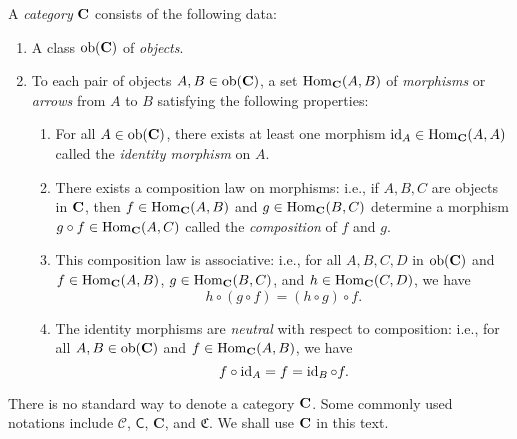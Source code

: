
\begin{definition}[Category]
    A \emph{category} \(\mathbf{C}\) consists of the following data:
    \begin{enumerate}[label=(\alph*), itemsep=0pt]
        \item A class \(\operatorname{ob}(\mathbf{\mathbf{C}})\) of \emph{objects}.
        \item To each pair of objects \(A, B \in \operatorname{ob}(\mathbf{\mathbf{C}})\), a set
        \(\operatorname{Hom}_{\mathbf{C}}(A, B)\) of \emph{morphisms} or \emph{arrows} from
        \(A\) to \(B\) satisfying the following properties:
        \begin{enumerate}[label=(\roman*), itemsep=0pt]
            \item For all \(A \in \operatorname{ob}(\mathbf{\mathbf{C}})\), there exists at least one
            morphism \(\operatorname{id}_A \in \operatorname{Hom}_{\mathbf{C}}(A, A)\) called the
            \emph{identity morphism} on \(A\).
            
            \item There exists a composition law on morphisms: i.e., if \(A, B,
            C\) are objects in \(\mathbf{C}\), then \(f \in \operatorname{Hom}_{\mathbf{C}}(A,
            B)\) and \(g \in \operatorname{Hom}_{\mathbf{C}}(B, C)\) determine a morphism \(g
            \circ f \in \operatorname{Hom}_{\mathbf{C}}(A, C)\) called the \emph{composition} of
            \(f\) and \(g\). 
            
            \item This composition law is associative: i.e., for all \(A, B, C,
            D\) in \(\operatorname{ob}(\mathbf{\mathbf{C}})\) and \(f \in \operatorname{Hom}_{\mathbf{C}}(A, B)\), \(g
            \in \operatorname{Hom}_{\mathbf{C}}(B, C)\), and \(h \in \operatorname{Hom}_{\mathbf{C}}(C, D)\), we
            have
            \[
                h \circ (g \circ f) = (h \circ g) \circ f.
            \]

            \item The identity morphisms are \emph{neutral} with respect to
            composition: i.e., for all \(A, B \in \operatorname{ob}(\mathbf{\mathbf{C}})\) and \(f \in
            \operatorname{Hom}_{\mathbf{C}}(A, B)\), we have
            \[
                f \circ \operatorname{id}_A = f = \operatorname{id}_B \circ f.
            \]
        \end{enumerate}
    \end{enumerate}
\end{definition}

There is no standard way to denote a category \(\mathbf{C}\). Some commonly used
notations include \(\mathcal{C}\), \(\mathsf{C}\), \(\mathbf{C}\), and
\(\mathfrak{C}\). We shall use \(\mathbf{C}\) in this text.

